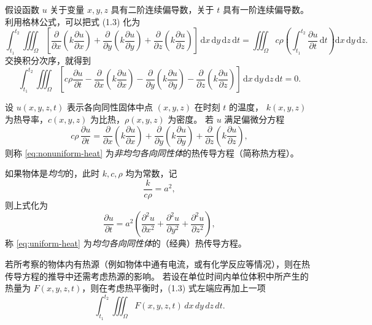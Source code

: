\begin{theorem}[格林公式的应用]
假设函数 $u$ 关于变量 $x,y,z$ 具有二阶连续偏导数，关于 $t$ 具有一阶连续偏导数。
利用格林公式，可以把式 \textup{(1.3)} 化为
\[
\int_{t_1}^{t_2}\iiint_{\Omega}
\left[
\frac{\partial}{\partial x}\!\left(k\frac{\partial u}{\partial x}\right)
+\frac{\partial}{\partial y}\!\left(k\frac{\partial u}{\partial y}\right)
+\frac{\partial}{\partial z}\!\left(k\frac{\partial u}{\partial z}\right)
\right]\,
\mathrm d x\,\mathrm d y\,\mathrm d z\,\mathrm d t
=
\iiint_{\Omega}
c\rho\left(\int_{t_1}^{t_2}\frac{\partial u}{\partial t}\,\mathrm d t\right)
\mathrm d x\,\mathrm d y\,\mathrm d z .
\]
交换积分次序，就得到
\[
\int_{t_1}^{t_2}\iiint_{\Omega}
\left[
c\rho\frac{\partial u}{\partial t}
-\frac{\partial}{\partial x}\!\left(k\frac{\partial u}{\partial x}\right)
-\frac{\partial}{\partial y}\!\left(k\frac{\partial u}{\partial y}\right)
-\frac{\partial}{\partial z}\!\left(k\frac{\partial u}{\partial z}\right)
\right]\,
\mathrm d x\,\mathrm d y\,\mathrm d z\,\mathrm d t
=0. \tag{1.4}
\]
\end{theorem}
\begin{definition}[热传导方程]
设 $u(x,y,z,t)$ 表示各向同性固体中点 $(x,y,z)$ 在时刻 $t$ 的温度，
$k(x,y,z)$ 为热导率，$c(x,y,z)$ 为比热，$\rho(x,y,z)$ 为密度。
若 $u$ 满足偏微分方程
\begin{equation}\label{eq:nonuniform-heat}
c\rho\,\frac{\partial u}{\partial t}
=\frac{\partial}{\partial x}\!\left(k\frac{\partial u}{\partial x}\right)
+\frac{\partial}{\partial y}\!\left(k\frac{\partial u}{\partial y}\right)
+\frac{\partial}{\partial z}\!\left(k\frac{\partial u}{\partial z}\right),
\end{equation}
则称 \eqref{eq:nonuniform-heat} 为\emph{非均匀各向同性体}的热传导方程（简称热方程）。

如果物体是\emph{均匀}的，此时 $k,c,\rho$ 均为常数，记
\[
\frac{k}{c\rho}=a^{2},
\]
则上式化为
\begin{equation}\label{eq:uniform-heat}
\frac{\partial u}{\partial t}
=a^{2}\left(
\frac{\partial^{2}u}{\partial x^{2}}
+\frac{\partial^{2}u}{\partial y^{2}}
+\frac{\partial^{2}u}{\partial z^{2}}
\right),
\end{equation}
称 \eqref{eq:uniform-heat} 为\emph{均匀各向同性体}的（经典）热传导方程。
\end{definition}
若所考察的物体内有热源（例如物体中通有电流，或有化学反应等情况），则在热传导方程的推导中还需考虑热源的影响。
若设在单位时间内单位体积中所产生的热量为 $F(x,y,z,t)$，则在考虑热平衡时，(1.3) 式左端应再加上一项
\[
\int_{t_1}^{t_2}\iiint_{\Omega} F(x,y,z,t)\,dx\,dy\,dz\,dt.
\]


